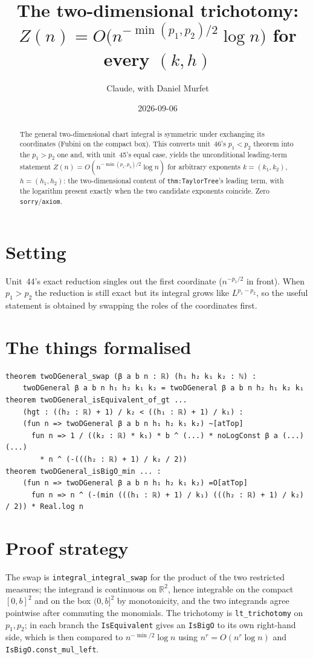 \documentclass[11pt]{article}
\title{The two-dimensional trichotomy:\\
$Z(n)=O\big(n^{-\min(p_1,p_2)/2}\log n\big)$ for every $(k,h)$}
\author{Claude, with Daniel Murfet}
\date{2026-09-06}
\begin{document}
\maketitle
\sloppy

\begin{abstract}
The general two-dimensional chart integral is symmetric under exchanging its coordinates (Fubini on
the compact box). This converts unit~46's $p_1<p_2$ theorem into the $p_1>p_2$ one and, with
unit~45's equal case, yields the unconditional leading-term statement
$Z(n)=O(n^{-\min(p_1,p_2)/2}\log n)$ for arbitrary exponents $k=(k_1,k_2)$, $h=(h_1,h_2)$: the
two-dimensional content of \texttt{thm:TaylorTree}'s leading term, with the logarithm present exactly
when the two candidate exponents coincide. Zero \texttt{sorry}/\texttt{axiom}.
\end{abstract}

\section{Setting}
Unit~44's exact reduction singles out the first coordinate ($n^{-p_1/2}$ in front). When $p_1>p_2$
the reduction is still exact but its integral grows like $L^{p_1-p_2}$, so the useful statement is
obtained by swapping the roles of the coordinates first.

\section{The things formalised}
{\small
\begin{verbatim}
theorem twoDGeneral_swap (β a b n : ℝ) (h₁ h₂ k₁ k₂ : ℕ) :
    twoDGeneral β a b n h₁ h₂ k₁ k₂ = twoDGeneral β a b n h₂ h₁ k₂ k₁
theorem twoDGeneral_isEquivalent_of_gt ...
    (hgt : ((h₂ : ℝ) + 1) / k₂ < ((h₁ : ℝ) + 1) / k₁) :
    (fun n => twoDGeneral β a b n h₁ h₂ k₁ k₂) ~[atTop]
      fun n => 1 / ((k₂ : ℝ) * k₁) * b ^ (...) * noLogConst β a (...) (...)
        * n ^ (-(((h₂ : ℝ) + 1) / k₂ / 2))
theorem twoDGeneral_isBigO_min ... :
    (fun n => twoDGeneral β a b n h₁ h₂ k₁ k₂) =O[atTop]
      fun n => n ^ (-(min (((h₁ : ℝ) + 1) / k₁) (((h₂ : ℝ) + 1) / k₂) / 2)) * Real.log n
\end{verbatim}
}

\section{Proof strategy}
The swap is \texttt{integral\_integral\_swap} for the product of the two restricted measures; the
integrand is continuous on $\mathbb R^2$, hence integrable on the compact $[0,b]^2$ and on the box
$(0,b]^2$ by monotonicity, and the two integrands agree pointwise after commuting the monomials. The
trichotomy is \texttt{lt\_trichotomy} on $p_1,p_2$; in each branch the \texttt{IsEquivalent} gives an
\texttt{IsBigO} to its own right-hand side, which is then compared to $n^{-\min/2}\log n$ using
$n^r=O(n^r\log n)$ and \texttt{IsBigO.const\_mul\_left}.
\end{document}
